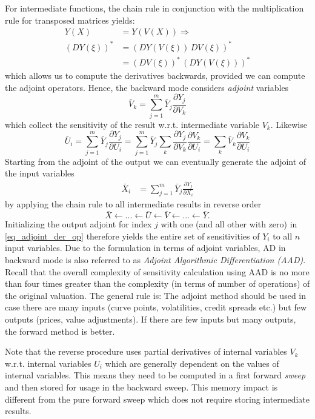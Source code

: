 For intermediate functions, the chain rule in conjunction with the multiplication rule for transposed matrices yields:
\begin{align*}
Y(X) &= Y(V(X)) \Rightarrow\\
(DY(\xi))^* &= (DY(V(\xi))\,DV(\xi))^* \\
&= (DV(\xi))^*\,(DY(V(\xi)))^*
\end{align*}
which allows us to compute the derivatives backwards, provided we can compute the adjoint operators.
Hence, the backward mode considers {\em adjoint} variables
$$
\bar V_k = \sum_{j=1}^m \bar Y_j \frac{\partial Y_j}{\partial V_k}
$$
which collect the sensitivity of the result w.r.t. intermediate
variable $V_k$. Likewise
$$
\bar U_i = \sum_{j=1}^m \bar Y_j \frac{\partial Y_j}{\partial U_i}
= \sum_{j=1}^m \bar Y_j \sum_k \frac{\partial Y_j}{\partial
  V_k}\frac{\partial V_k}{\partial U_i}
= \sum_k \bar V_k \frac{\partial V_k}{\partial U_i}
$$
Starting from the adjoint of the output we can eventually generate the
adjoint of the input variables
\begin{align}
  \label{eq_adjoint_der_op}
\bar X_i & = \sum_{j=1}^m \bar Y_j \frac{\partial Y_j}{\partial X_i}
\end{align}
by applying the chain rule to all intermediate results in reverse
order
$$
\bar X \leftarrow ... \leftarrow \bar U \leftarrow \bar V \leftarrow
... \leftarrow \bar Y.
$$
Initializing the output adjoint for index $j$ with one (and all other
with zero) in \eqref{eq_adjoint_der_op} therefore yields the entire set of sensitivities of $Y_i$
to all $n$ input variables. Due to the formulation in terms of
adjoint variables, AD in backward mode is also referred to as {\em Adjoint Algorithmic Differentiation
  (AAD)}.
Recall that the overall complexity of sensitivity calculation using AAD is no more than
four times greater than the complexity (in terms of number of operations)
of the original valuation. The general rule is: The adjoint method should be used in case there
are many inputs (curve points, volatilities, credit spreads etc.) but few outputs (prices,
value adjustments). If there are few inputs but many outputs, the forward method is better.

\medskip
Note that the reverse procedure uses
partial derivatives of internal variables $V_k$ w.r.t. internal
variables $U_i$ which are generally dependent on the values of
internal variables. This means they need to be computed in a first
forward {\em sweep} and then stored for usage in the backward sweep.
This memory impact is different from the pure forward sweep which
does not require storing intermediate results.

